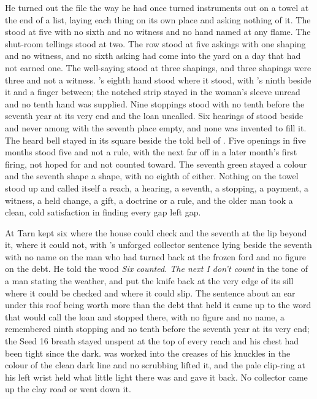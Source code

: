 He turned out the file the way he had once turned instruments out on a towel at the end of a list, laying each thing on its own place and asking nothing of it. The  stood at five with no sixth and no witness and no hand named at any flame. The shut-room tellings stood at two. The row stood at five askings with one shaping and no witness, and no sixth asking had come into the yard on a day that had not earned one. The well-saying stood at three shapings, and three shapings were three and not a witness. 's eighth hand stood where it stood, with 's ninth beside it and a finger between; the notched strip stayed in the woman's sleeve unread and no tenth hand was supplied. Nine stoppings stood with no tenth before the seventh year at its very end and the loan uncalled. Six hearings of  stood beside and never among with the seventh place empty, and none was invented to fill it. The heard bell stayed in its square beside the told bell of . Five openings in five months stood five and not a rule, with the next far off in a later month's first firing, not hoped for and not counted toward. The seventh green stayed a colour and the seventh shape a shape, with no eighth of either. Nothing on the towel stood up and called itself a reach, a hearing, a seventh, a stopping, a payment, a witness, a held change, a gift, a doctrine or a rule, and the older man took a clean, cold satisfaction in finding every gap left gap.

\scenebreak

At  Tarn kept six where the house could check and the seventh at the lip beyond it, where it could not, with 's unforged collector sentence lying beside the seventh with no name on the man who had turned back at the frozen ford and no figure on the debt. He told the wood \emph{Six counted. The next I don't count} in the tone of a man stating the weather, and put the knife back at the very edge of its sill where it could be checked and where it could slip. The sentence about an ear under this roof being worth more than the debt that held it came up to the word that would call the loan and stopped there, with no figure and no name, a remembered ninth stopping and no tenth before the seventh year at its very end; the Seed 16 breath stayed unspent at the top of every reach and his chest had been tight since the dark.  was worked into the creases of his knuckles in the colour of the clean dark line and no scrubbing lifted it, and the pale clip-ring at his left wrist held what little light there was and gave it back. No collector came up the clay road or went down it.

